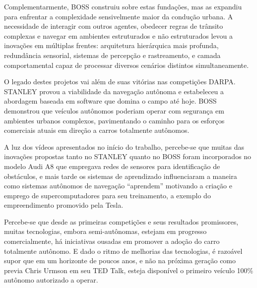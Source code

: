 Complementarmente, BOSS construiu sobre estas fundações, mas as expandiu para enfrentar a complexidade sensivelmente maior da condução urbana. A necessidade de interagir com outros agentes, obedecer regras de trânsito complexas e navegar em ambientes estruturados e não estruturados levou a inovações em múltiplas frentes: arquitetura hierárquica mais profunda, redundância sensorial, sistemas de percepção e rastreamento, e camada comportamental capaz de processar diversos cenários distintos simultaneamente.

O legado destes projetos vai além de suas vitórias nas competições DARPA. STANLEY provou a viabilidade da navegação autônoma e estabeleceu a abordagem baseada em software que domina o campo até hoje. BOSS demonstrou que veículos autônomos poderiam operar com segurança em ambientes urbanos complexos, pavimentando o caminho para os esforços comerciais atuais em direção a carros totalmente autônomos.

A luz dos vídeos apresentados no início do trabalho, percebe-se que muitas das inovações propostas tanto no STANLEY quanto no BOSS foram incorporados no modelo Audi A8 que empregava redes de sensores para identificação de obstáculos, e mais tarde os sistemas de aprendizado influenciaram a maneira como sistemas autônomos de navegação ``aprendem'' motivando a criação e emprego de supercomputadores para seu treinamento, a exemplo do empreendimento promovido pela Tesla.

Percebe-se que desde as primeiras competições e seus resultados promissores, muitas tecnologias, embora semi-autônomas, estejam em progresso comercialmente, há iniciativas ousadas em promover a adoção do carro totalmente autônomo. E dado o ritmo de melhorias das tecnologias, é razoável supor que em um horizonte de poucos anos, e não na próxima geração como previa Chris Urmson em seu TED Talk, esteja disponível o primeiro veículo 100\% autônomo autorizado a operar.